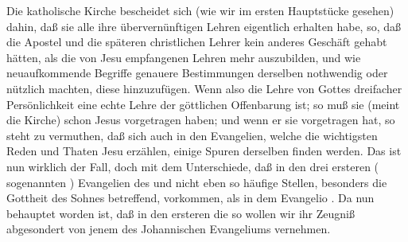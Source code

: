 Die katholische Kirche bescheidet sich (wie wir im ersten Hauptstücke gesehen) dahin, daß sie alle ihre übervernünftigen Lehren eigentlich  erhalten habe, so, daß die Apostel und die späteren christlichen Lehrer kein anderes Geschäft gehabt hätten, als die von Jesu empfangenen Lehren mehr auszubilden, und wie neuaufkommende Begriffe genauere Bestimmungen derselben nothwendig oder nützlich machten, diese hinzuzufügen. Wenn also die Lehre von Gottes dreifacher Persönlichkeit eine echte Lehre der göttlichen Offenbarung ist; so muß sie (meint die Kirche) schon Jesus vorgetragen haben; und wenn er sie vorgetragen hat, so steht zu vermuthen, daß sich auch in den Evangelien, welche die wichtigsten Reden und Thaten Jesu erzählen, einige Spuren derselben finden werden. Das ist nun wirklich der Fall, doch mit dem Unterschiede, daß in den drei ersteren ( sogenannten ) Evangelien des  und  nicht eben so häufige Stellen, besonders die Gottheit des Sohnes betreffend, vorkommen, als in dem Evangelio . Da nun behauptet worden ist, daß in den ersteren die  so wollen wir ihr Zeugniß abgesondert von jenem des Johannischen Evangeliums vernehmen.
